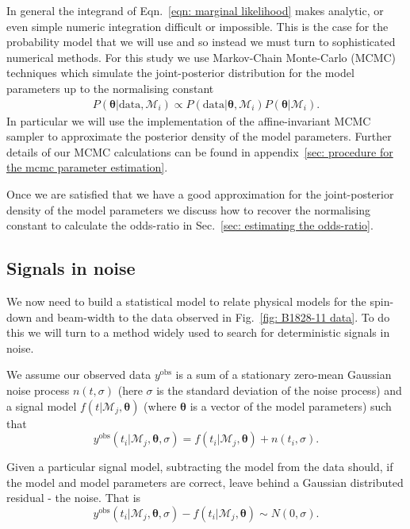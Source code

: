 \documentclass[../full_thesis/full_thesis.tex]{subfiles}
\newcommand{\M}{\mathcal{M}}
\newcommand{\data}{\textrm{data}}
\newcommand{\params}{\boldsymbol{\theta}}
\newcommand{\yobs}{y^{\textrm{obs}}}
\begin{document}
In general the integrand of Eqn.~\eqref{eqn: marginal likelihood} makes
analytic, or even simple numeric integration difficult or impossible. This is
the case for the probability model that we will use and so instead we must turn
to sophisticated numerical methods.  For this study we use Markov-Chain
Monte-Carlo (MCMC) techniques which simulate the joint-posterior distribution
for the model parameters up to the normalising constant
\begin{align}
P(\params | \data, \M_{i}) \propto
P(\data| \params, \M_{i})P(\params | \M_{i}).
\end{align}
In particular we will use the \citet{Foreman-Mackay2013} implementation of the
affine-invariant MCMC sampler \citep{Goodman2010} to approximate the posterior
density of the model parameters.  Further details of our MCMC calculations can
be found in appendix~\ref{sec: procedure for the mcmc parameter estimation}.

Once we are satisfied that we have a good approximation for the joint-posterior
density of the model parameters we discuss how to recover the normalising
constant to calculate the odds-ratio in Sec.~\ref{sec: estimating the
odds-ratio}.

\subsection{Signals in noise}
We now need to build a statistical model to relate physical models for the
spin-down and beam-width to the data observed in Fig.~\ref{fig: B1828-11 data}.
To do this we will turn to a method widely used to search for deterministic
signals in noise.

We assume our observed data $\yobs$ is a sum of a stationary zero-mean
Gaussian noise process
$n(t, \sigma)$ (here $\sigma$ is the  standard deviation of the noise process)
and a signal model $f(t| \M_{j}, \params)$ (where $\params$ is a vector of the
model parameters) such that
\begin{equation}
\yobs(t_i| \M_{j}, \params, \sigma) = f(t_i|\M_{j}, \params) + n(t_i, \sigma).
\label{eqn: yobs def}
\end{equation}

Given a particular signal model, subtracting the model from the data
should, if the model and model parameters are correct, leave behind a Gaussian
distributed residual - the noise. That is
\begin{equation}
\yobs(t_i| \M_{j}, \params, \sigma) - f(t_i|\M_{j}, \params) \sim N(0, \sigma).
\end{equation}
\end{document}
